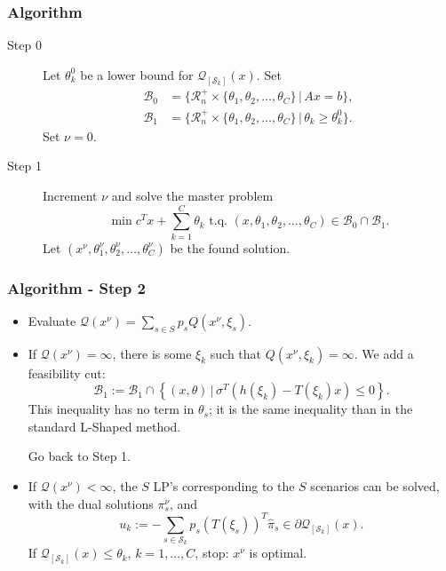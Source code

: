 \documentclass{beamer}
\def\rit{\mathcal{R}}
\begin{document}
\begin{frame}
\frametitle{Algorithm}

\begin{description}
\item[Step 0]
Let $\theta_k^0$ be a lower bound for $\mathcal{Q}_{[\mathcal{S}_k]}(x)$.
Set
\begin{align*}
\mathcal{B}_0 &= \lbrace \rit_n^+ \times \lbrace \theta_1,
\theta_2,\ldots, \theta_C \rbrace \,|\, Ax = b \rbrace, \\
\mathcal{B}_1 &= \lbrace \rit_n^+ \times \lbrace \theta_1,
\theta_2,\ldots, \theta_C \rbrace \,|\, \theta_k \geq \theta_k^0 \rbrace.
\end{align*}
Set $\nu = 0$.
\item[Step 1]
Increment $\nu$ and solve the {\blue master problem}
\[
\min c^Tx + \sum_{k = 1}^C \theta_k \mbox{ t.q. } (x, \theta_1,
\theta_2,\ldots,  \theta_C) \in \mathcal{B}_0 \cap \mathcal{B}_1.
\]
Let $(x^{\nu}, \theta_1^{\nu}, \theta_2^{\nu},\ldots,
\theta_C^{\nu})$ be the found solution.
\end{description}

\end{frame}

\begin{frame}
\frametitle{Algorithm - Step 2}

\begin{itemize}
\item
Evaluate $\mathcal{Q}(x^{\nu}) = \sum_{s \in S} p_s Q(x^{\nu}, \xi_s)$.
\item
If $\mathcal{Q}(x^{\nu}) = \infty$, there is some $\xi_k$ such that $Q(x^{\nu}, \xi_k) = \infty$.
We add a {\red feasibility cut}:
\[
\mathcal{B}_1 := \mathcal{B}_1 \cap \left\lbrace (x, \theta) \,|\,
\sigma^T(h(\xi_k)-T(\xi_k)x) \leq 0 \right\rbrace.
\]
This inequality has no term in $\theta_s$; it is the same inequality than in the standard L-Shaped method.

Go back to Step 1.
\item
If $\mathcal{Q}(x^{\nu}) < \infty$, the $S$ LP's corresponding to the $S$ scenarios can be solved, with the dual solutions $\pi_s^{\nu}$, and
\[
u_k := -\sum_{s \in \mathcal{S}_k} p_s(T(\xi_s))^T\hat{\pi}_s
\in \partial \mathcal{Q}_{[\mathcal{S}_k]}(x).
\]
If $\mathcal{Q}_{[\mathcal{S}_k]}(x) \leq \theta_k$, $k = 1,\ldots,C$, stop: $x^{\nu}$ is optimal.
\end{itemize}

\end{frame}
\end{document}
